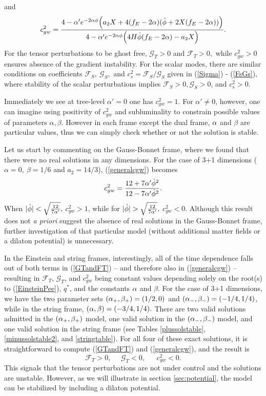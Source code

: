 \documentclass[amsmath,amssymb,11pt]{article}
\newcommand{\beq}{\begin{equation}}
\newcommand{\eeq}{\end{equation}}
\begin{document}
and
\beq \label{generalcgw} c^{2}_{gw}=\frac{4-\a' e^{-2\a\phi}\Big(a_2 X+4(f_E-2\a)(\ddot{\phi}+2X(f_E-2\a))\Big)}{4-\a' e^{-2\a\phi}\Big(4H\dot{\phi}(f_E-2\a)-a_2X\Big)} .
\eeq
For the tensor perturbations to be ghost free, $\mathcal{G}_T>0$ and $\mathcal{F}_{T}>0,$ while $c_{gw}^2>0$ ensures absence of the gradient instability. For the scalar modes, there are similar conditions on coefficients $\mathcal{F}_S, \ \mathcal{G}_S,$ and $c_s^2=\mathcal{F}_S/\mathcal{G}_S$ given in (\ref{Sigma}) - (\ref{FsGs}), where stability of the scalar perturbations implies $\mathcal{F}_S>0, \mathcal{G}_S>0$, and $c_s^2>0.$

Immediately we see at tree-level $\alpha'=0$ one has $c^{2}_{gw}=1$. For $\alpha'\neq0$, however, one can imagine using positivity of $c^{2}_{gw}$ and subluminality to constrain possible values of parameters $\alpha,\beta$. However in each frame except the dual frame, $\alpha$ and $\beta$ are particular values, thus we can simply check whether or not the solution is stable. 

Let us start by commenting on the Gauss-Bonnet frame, where we found that there were no real solutions in any dimensions. For the case of 3+1 dimensions ($\alpha=0,\ \beta=1/6$ and $a_2=14/3$),  (\ref{generalcgw}) becomes
\begin{equation}
c_{gw}^2=\frac{12+7\alpha'\dot{\phi}^2}{12-7\alpha'\dot{\phi}^2}.
\end{equation}
When $|\dot{\phi}|<\sqrt{\frac{12}{7\alpha'}},$ $c_{gw}^2>1$, while for $|\dot{\phi}|>\sqrt{\frac{12}{7\a'}},$ $c_{gw}^2<0.$ Although this result does not \emph{a priori} suggest the absence of real solutions in the Gauss-Bonnet frame, further investigation of that particular model (without additional matter fields or a dilaton potential) is unnecessary. 



In the Einstein and string frames, interestingly, all of the time dependence falls out of both terms in (\ref{GTandFT}) -- and therefore also in (\ref{generalcgw}) -- resulting in $\mathcal{F}_T$, $\mathcal{G}_T$, and $c_{gw}^2$ being constant values depending solely on the root(s) to (\ref{EinsteinPee}), $q^*$, and the constants $\alpha$ and $\beta.$ For the case of 3+1 dimensions, we have the two parameter sets $(\alpha_+,\beta_+)=(1/2,0)$ and $(\alpha_-,\beta_-)=(-1/4,1/4)$, while in the string frame, $(\alpha,\beta)= (-3/4,1/4).$ There are two valid solutions admitted in the $(\alpha_+,\beta_+)$ model, one valid solution in the $(\alpha_-,\beta_-)$ model, and one valid solution in the string frame (see Tables \ref{plussolstable}, \ref{minussolstable2}, and \ref{stringtable}). For all four of these exact solutions, it is straightforward to compute (\ref{GTandFT}) and (\ref{generalcgw}), and the result is
\begin{equation}
\mathcal{F}_{T} > 0, \ \ \ \ \ \ \mathcal{G}_T < 0, \ \ \ \ \ \ \ c_{gw}^2<0.
\end{equation}
This signals that the tensor perturbations are not under control and the solutions are unstable. However, as we will illustrate in section \ref{sec:potential}, the model can be stabilized by including a dilaton potential.
\end{document}

